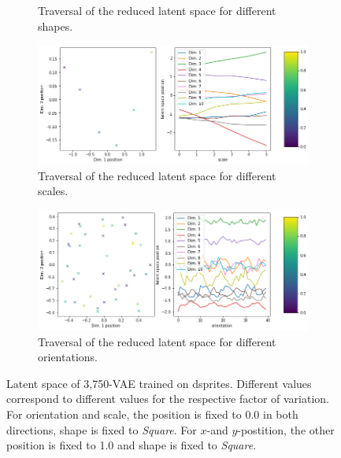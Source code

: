 \documentclass[11pt,a4paper]{article}
\begin{document}
\begin{figure}[H]
\begin{subfigure}{.48\textwidth}
\caption{Traversal of the reduced latent space for different shapes.}
\end{subfigure}
\begin{subfigure}{.48\textwidth}
\includegraphics[width=\textwidth]{images/latent_space_traversals/vae_3750_dsprites_latent_space_values_scale.png}
\caption{Traversal of the reduced latent space for different scales.}
\end{subfigure}
\begin{subfigure}{.48\textwidth}
\includegraphics[width=\textwidth]{images/latent_space_traversals/vae_3750_dsprites_latent_space_values_orientation.png}
\caption{Traversal of the reduced latent space for different orientations.}
\end{subfigure}
\caption[\ac{VAE} on dsprites: Latent Space Values]{Latent space of 3,750-\ac{VAE} trained on dsprites. Different values correspond to different values for the respective factor of variation. For orientation and scale, the position is fixed to 0.0 in both directions, shape is fixed to \textit{Square}. For $x$-and $y$-postition, the other position is fixed to 1.0 and shape is fixed to \textit{Square}.}
\label{fig:vae_dsprite_3750_latent_space_position}
\end{figure}
\end{document}
